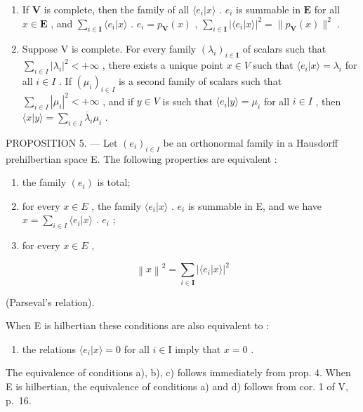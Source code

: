 \begin{enumerate}
\def\labelenumi{\arabic{enumi})}
\setcounter{enumi}{1}
\item
  If \(\mathbf{V}\) is complete, then the family of all \(\langle e_i|x\rangle\) . \(e_i\) is summable in \(\mathbf{E}\) for all \(x\in\mathbf{E}\) , and \(\sum_{i\in\mathbf{I}}\langle e_i|x\rangle\) . \(e_i=p_{\mathbf{V}}(x)\) , \(\sum_{i\in\mathbf{I}}|\langle e_i|x\rangle|^2=\|p_{\mathbf{V}}(x)\|^2\) .
\item
  Suppose V is complete. For every family \((\lambda_{i})_{i\in\mathbf{I}}\) of scalars such that \(\sum_{i\in I}|\lambda_{i}|^{2}<+\infty\) , there exists a unique point \(x\in V\) such that \(\langle e_{i}|x\rangle=\lambda_{i}\) for all \(i\in I\) . If \((\mu_{i})_{i\in I}\) is a second family of scalars such that \(\sum_{i\in I}\left|\mu_{i}\right|^{2}<+\infty\) , and if \(y\in V\) is such that \(\langle e_{i}|y\rangle=\mu_{i}\) for all \(i\in I\) , then \(\langle x|y\rangle=\sum_{i\in I}\overline{\lambda}_{i}\mu_{i}\) .
\end{enumerate}

PROPOSITION 5. --- Let \((e_i)_{i \in I}\) be an orthonormal family in a Hausdorff prehilbertian space E. The following properties are equivalent :

\begin{enumerate}
\def\labelenumi{\alph{enumi})}
\item
  the family \((e_i)\) is total;
\item
  for every \(x \in E\) , the family \(\langle e_{i}|x\rangle\) . \(e_{i}\) is summable in E, and we have \(x = \sum_{i \in I} \langle e_{i}|x\rangle\) . \(e_{i}\) ;
\item
  for every \(x \in E\) ,
\end{enumerate}

\[
\left\| x \right\| ^ {2} = \sum_ {i \in \mathbf {I}} \left| \langle e _ {i} | x \rangle \right| ^ {2}\tag{2}
\]

(Parseval's relation).

When E is hilbertian these conditions are also equivalent to :

\begin{enumerate}
\def\labelenumi{\alph{enumi})}
\setcounter{enumi}{3}
\tightlist
\item
  the relations \(\langle e_i|x\rangle = 0\) for all \(i\in \mathrm{I}\) imply that \(x = 0\) .
\end{enumerate}

The equivalence of conditions a), b), c) follows immediately from prop. 4. When E is hilbertian, the equivalence of conditions a) and d) follows from cor. 1 of V, p.~16.

